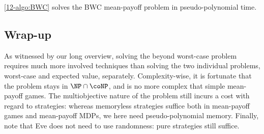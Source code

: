 \begin{corollary}
\cref{12-algo:BWC} solves the BWC mean-payoff problem in pseudo-poly\-no\-mial time.
\end{corollary}

\subsection*{Wrap-up} As witnessed by our long overview, solving the beyond worst-case problem requires much more involved techniques than solving the two individual problems, worst-case and expected value, separately. Complexity-wise, it is fortunate that the problem stays in $\NP \cap \coNP$, and is no more complex that simple mean-payoff games. The multiobjective nature of the problem still incurs a cost with regard to strategies: whereas memoryless strategies suffice both in mean-payoff games and mean-payoff MDPs, we here need pseudo-polynomial memory. Finally, note that Eve does not need to use randomness: pure strategies still suffice.
